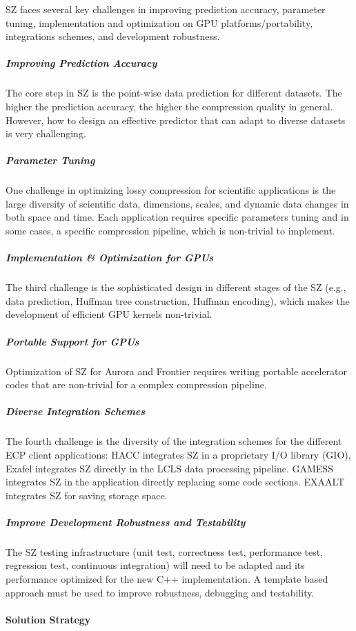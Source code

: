 SZ faces several key challenges in improving prediction accuracy, parameter tuning, implementation and optimization on GPU platforms/portability, integrations schemes, and development robustness.

\subparagraph{Improving Prediction Accuracy} The core step in SZ is the point-wise data prediction for different datasets. The higher the prediction accuracy, the higher the compression quality in general. However, how to design an effective predictor that can adapt to diverse datasets is very challenging.
\subparagraph{Parameter Tuning} One challenge in optimizing lossy compression for scientific applications is the large
diversity of scientific data, dimensions, scales, and dynamic data changes in both space and time. Each application requires specific parameters tuning and in some cases, a specific compression pipeline, which is non-trivial to implement.
\subparagraph{Implementation \& Optimization for GPUs} The third challenge is the sophisticated design in different stages of the SZ (e.g., data prediction, Huffman tree construction, Huffman encoding), which makes the development of efficient GPU kernels non-trivial.
\subparagraph{Portable Support for GPUs} Optimization of SZ for Aurora and Frontier requires writing portable accelerator codes that are non-trivial for a complex compression pipeline. 
\subparagraph{Diverse Integration Schemes} The fourth challenge is the diversity of the integration schemes for the different ECP client applications: HACC integrates SZ in a proprietary I/O library (GIO), Exafel integrates SZ directly in the LCLS data processing pipeline. GAMESS integrates SZ in the application directly replacing some code sections. EXAALT integrates SZ for saving storage space.
\subparagraph{Improve Development Robustness and Testability} The SZ testing infrastructure (unit test, correctness test, performance test, regression test, continuous integration) will need to be adapted and its performance optimized for the new C++ implementation. A template based approach must be used to improve robustness, debugging and testability.


\paragraph{Solution Strategy}

